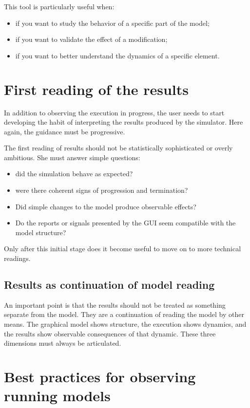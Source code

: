 This tool is particularly useful when:
\begin{itemize}
\item if you want to study the behavior of a specific part of the model;
\item if you want to validate the effect of a modification;
\item if you want to better understand the dynamics of a specific element.
\end{itemize}

\section{First reading of the results}
\label{sec:cap5_primeira_leitura_resultados}

In addition to observing the execution in progress, the user needs to start developing the habit of interpreting the results produced by the simulator. Here again, the guidance must be progressive.

The first reading of results should not be statistically sophisticated or overly ambitious. She must answer simple questions:
\begin{itemize}
\item did the simulation behave as expected?
\item were there coherent signs of progression and termination?
\item Did simple changes to the model produce observable effects?
\item Do the reports or signals presented by the GUI seem compatible with the model structure?
\end{itemize}

Only after this initial stage does it become useful to move on to more technical readings.

\subsection{Results as continuation of model reading}
\label{subsec:cap5_resultados_continuacao_leitura}

An important point is that the results should not be treated as something separate from the model. They are a continuation of reading the model by other means. The graphical model shows structure, the execution shows dynamics, and the results show observable consequences of that dynamic. These three dimensions must always be articulated.

\section{Best practices for observing running models}
\label{sec:cap5_boas_praticas_observacao_execucao}

